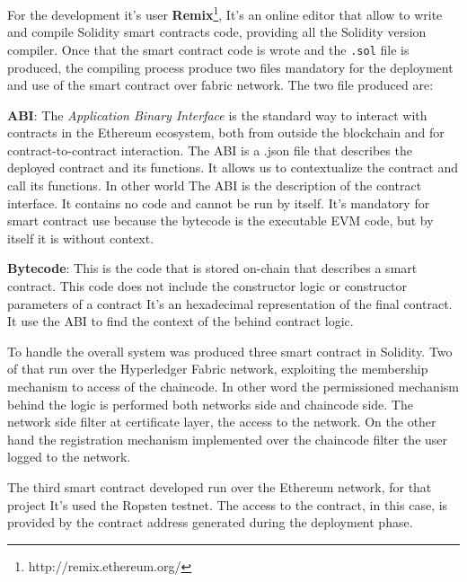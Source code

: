 For the development it's user \textbf{Remix}\footnote{http://remix.ethereum.org/}, It's an online
editor that allow to write and compile Solidity smart contracts code, providing all the Solidity
version compiler. Once that the smart contract code is wrote and the \texttt{.sol} file is produced, 
the compiling process produce two files mandatory for the deployment and use of the smart contract 
over fabric network. 
The two file produced are: 
\begin{outline}
    \1 \textbf{ABI}: The \textit{Application Binary Interface} is the standard way to interact with 
    contracts in the Ethereum ecosystem, both from outside the blockchain and for contract-to-contract 
    interaction. The ABI is a .json file that describes the deployed contract and its functions. 
    It allows us to contextualize the contract and call its functions. In other world 
    The ABI is the description of the contract interface. It contains no code and cannot be run by 
    itself. It's mandatory for smart contract use because the bytecode is the executable EVM code, 
    but by itself it is without context.

    \1 \textbf{Bytecode}: This is the code that is stored on-chain that describes a smart contract. 
    This code does not include the constructor logic or constructor parameters of a contract 
    It's an hexadecimal representation of the final contract. It use the ABI to find the 
    context of the behind contract logic. 
\end{outline}

\bigskip

To handle the overall system was produced three smart contract in Solidity. Two of that run over 
the Hyperledger Fabric network, exploiting the membership mechanism to access of the chaincode.
In other word the permissioned mechanism behind the logic is performed both networks side and 
chaincode side. The network side filter at certificate layer, the access to the network.
On the other hand the registration mechanism implemented over the chaincode filter the user
logged to the network. 
\bigskip

The third smart contract developed run over the Ethereum network, for that project It's used the 
Ropsten testnet. The access to the contract, in this case, is provided by the contract address 
generated during the deployment phase. 
\bigskip

